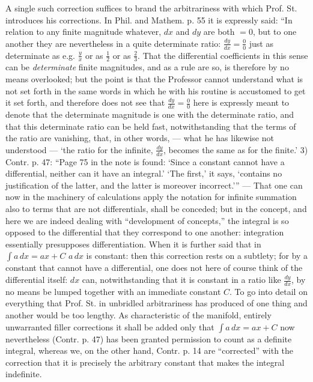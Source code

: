 \documentclass[12pt,a4paper,openany]{book}
\begin{document}
{A single such correction suffices to brand the arbitrariness with which Prof. St. introduces his corrections. In
Phil. and Mathem. p. 55 it is expressly said: ``In relation to any
finite magnitude whatever, $dx$ and $dy$ are both $= 0$, but
to one another they are nevertheless in a quite determinate ratio: $\frac{dy}{dx} = \frac{0}{0}$ just as determinate as e.g. $\frac{y}{x}$ or as $\frac{1}{2}$ or
as $\frac{2}{3}$. That the differential coefficients in this sense can
be \emph{determinate} finite magnitudes, and as a rule are so, is therefore
by no means overlooked; but the point is that the Professor cannot understand what is not set forth in the same words in which he
with his routine is accustomed to get it set forth, and therefore does not
see that $\frac{dy}{dx} = \frac{0}{0}$ here is expressly meant to denote that the determinate
magnitude is one with the determinate ratio, and that this determinate
ratio can be held fast, notwithstanding that the terms of the ratio are vanishing,
that, in other words, --- what he has likewise not understood ---
`the ratio for the infinite, $\frac{dy}{dx}$, becomes the same as for the
finite.' 3) Contr. p. 47: ``Page 75 in the note is found: `Since
a constant cannot have a differential, neither can it
have an integral.' `The first,' it says, `contains no
justification of the latter, and the latter is moreover incorrect.''' --- That
one can now in the machinery of calculations apply the notation for
infinite summation also to terms that are not differentials,
shall be conceded; but in the concept, and here we are indeed dealing with ``development of concepts,'' the integral is so opposed to the differential that
they correspond to one another: integration essentially presupposes differentiation. When it is further said that in $\int a\,dx = ax + C$
$a\,dx$ is constant: then this correction rests on a subtlety;
for by a constant that cannot have a differential, one does
not here of course think of the differential itself: $dx$ can, notwithstanding that it
is constant in a ratio like $\frac{dy}{dx}$, by no means be lumped together with
an immediate %
constant $C$. To go into detail on everything that
Prof. St. in unbridled arbitrariness has produced of one thing and another
would be too lengthy. As characteristic of the manifold, entirely unwarranted filler corrections it shall be added only that $\int a\,dx = ax + C$ now nevertheless (Contr. p. 47) has been granted
permission to count as a definite integral, whereas we, on the other hand, Contr.
p. 14 are ``corrected'' with the correction that it is precisely the arbitrary
constant that makes the integral indefinite.}
\end{document}
